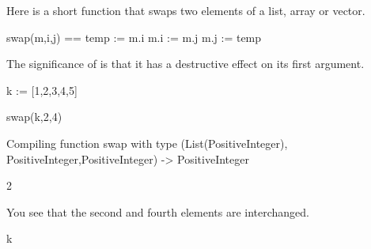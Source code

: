 \begin{xtc}
\begin{xtccomment}
Here is a short function that swaps two elements of a list,
array or vector.
\end{xtccomment}
\begin{spadsrc}
swap(m,i,j) ==
  temp := m.i
  m.i := m.j
  m.j := temp
\end{spadsrc}
\end{xtc}
\begin{xtc}
\begin{xtccomment}
The significance of  is that it has a destructive
effect on its first argument.
\end{xtccomment}
\begin{spadsrc}
k := [1,2,3,4,5] 
\end{spadsrc}
\begin{TeXOutput}
\begin{fricasmath}{2}
%
\end{fricasmath}
\end{TeXOutput}
\end{xtc}
\begin{xtc}
\begin{xtccomment}
\end{xtccomment}
\begin{spadsrc}
swap(k,2,4) 
\end{spadsrc}
\begin{MessageOutput}
   Compiling function swap with type (List(PositiveInteger),
      PositiveInteger,PositiveInteger) -> PositiveInteger 
\end{MessageOutput}
\begin{TeXOutput}
\begin{fricasmath}{3}
2%
\end{fricasmath}
\end{TeXOutput}
\end{xtc}
\begin{xtc}
\begin{xtccomment}
You see that the second and fourth elements are interchanged.
\end{xtccomment}
\begin{spadsrc}
k 
\end{spadsrc}
\begin{TeXOutput}
\begin{fricasmath}{4}
%
\end{fricasmath}
\end{TeXOutput}
\end{xtc}

